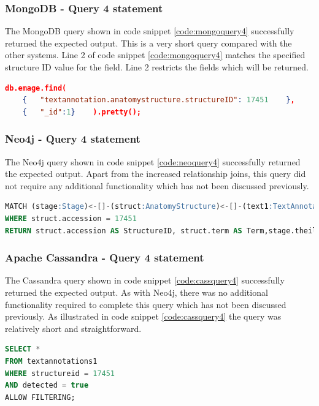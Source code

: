 \subsubsection*{MongoDB - Query 4 statement}\label{mongoquery4statement}
The MongoDB query shown in code snippet \ref{code:mongoquery4} successfully returned the expected output. This is a very short query compared with the other systems. Line 2 of code snippet \ref{code:mongoquery4} matches the specified structure ID value for the field. Line 2 restricts the fields which will be returned.

\begin{lstlisting}[language=json, caption=MongoDB query 4 statement. What is expressed in structure X?., label=code:mongoquery4]
db.emage.find(
	{	"textannotation.anatomystructure.structureID": 17451	},
	{	"_id":1}	).pretty();
\end{lstlisting}
\newpage
\subsubsection*{Neo4j - Query 4 statement}\label{neoquery4statement}
The Neo4j query shown in code snippet \ref{code:neoquery4} successfully returned the expected output. Apart from the increased relationship joins, this query did not require any additional functionality which has not been discussed previously.

\begin{lstlisting}[language=SQL, caption=Neo4j query 4 statement. What is expressed in structure X?., label=code:neoquery4]
MATCH (stage:Stage)<-[]-(struct:AnatomyStructure)<-[]-(text1:TextAnnotation)-[]->(assay:Assay)
WHERE struct.accession = 17451
RETURN struct.accession AS StructureID, struct.term AS Term,stage.theilerStage AS TheilerStage, assay.emageID AS EMAGEID
\end{lstlisting}

\subsubsection*{Apache Cassandra - Query 4 statement}\label{cassquery4statement}
The Cassandra query shown in code snippet \ref{code:cassquery4} successfully returned the expected output. As with Neo4j, there was no additional functionality required to complete this query which has not been discussed previously. As illustrated in code snippet \ref{code:cassquery4} the query was relatively short and straightforward.

\begin{lstlisting}[language=SQL, caption=Cassandra query 4 statement. What is expressed in structure X?., label=code:cassquery4]
SELECT *
FROM textannotations1
WHERE structureid = 17451
AND detected = true
ALLOW FILTERING;
\end{lstlisting}

